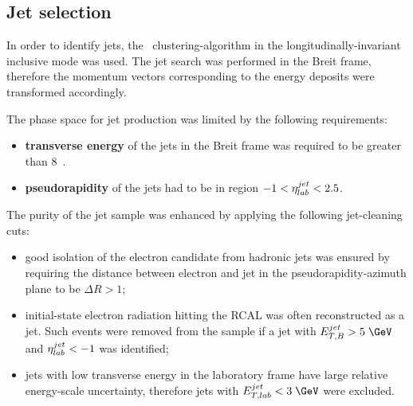 \subsection{Jet selection}
\label{subsec:jetselect}
In order to identify jets, the \kt~clustering-algorithm in the longitudinally-invariant inclusive mode was used. The jet search was performed in the Breit frame, therefore the momentum vectors corresponding to the energy deposits were transformed accordingly. 

The phase space for jet production was limited by the following requirements:
\begin{itemize}
	\item \textbf{transverse energy} of the jets in the Breit frame was required to be greater than 8~\GeV.
	\item \textbf{pseudorapidity} of the jets had to be in region $-1<\mbox{$\eta^{jet}_{lab}$}<2.5$.
\end{itemize}
The purity of the jet sample was enhanced by applying the following jet-cleaning cuts:

\begin{itemize}
	\item good isolation of the electron candidate from hadronic jets was ensured by requiring the distance between electron and jet in the pseudorapidity-azimuth plane to be $\Delta R > 1$;
	\item initial-state electron radiation hitting the RCAL was often reconstructed as a jet. Such events were removed from the sample if a jet with $\etjetb > 5\;\GeV$ and $\mbox{$\eta^{jet}_{lab}$} < -1$ was identified;
	\item jets with low transverse energy in the laboratory frame have large relative energy-scale uncertainty, therefore jets with $\etjetlab < 3\;\GeV$ were excluded.
\end{itemize}

